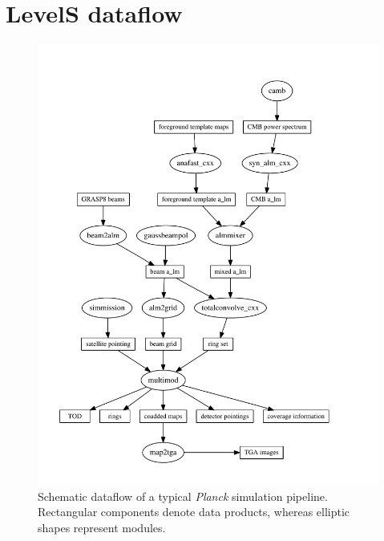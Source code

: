 \documentclass[pdf]{planckDoc}
\begin{document}
\clearpage


\appendix

\clearpage
\section{LevelS dataflow}
\begin{figure}[h]
  \begin{center}
    \includegraphics[angle=0,height=0.8\textheight]{pipeline.pdf}
  \end{center}
  \caption{Schematic dataflow of a typical \emph{Planck} simulation pipeline.
  Rectangular components denote data products, whereas elliptic
  shapes represent modules.}
\end{figure}

\clearpage

\end{document}
